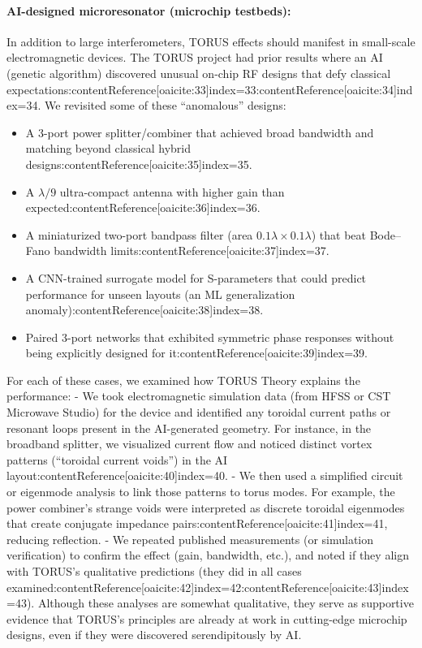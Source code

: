 \documentclass[12pt]{article}
\begin{document}
\paragraph{AI-designed microresonator (microchip testbeds):} In addition to large interferometers, TORUS effects should manifest in small-scale electromagnetic devices. The TORUS project had prior results where an AI (genetic algorithm) discovered unusual on-chip RF designs that defy classical expectations:contentReference[oaicite:33]{index=33}:contentReference[oaicite:34]{index=34}. We revisited some of these “anomalous” designs:
\begin{itemize}\itemsep 0pt
    \item A 3-port power splitter/combiner that achieved broad bandwidth and matching beyond classical hybrid designs:contentReference[oaicite:35]{index=35}.
    \item A $\lambda/9$ ultra-compact antenna with higher gain than expected:contentReference[oaicite:36]{index=36}.
    \item A miniaturized two-port bandpass filter (area $0.1\lambda \times 0.1\lambda$) that beat Bode–Fano bandwidth limits:contentReference[oaicite:37]{index=37}.
    \item A CNN-trained surrogate model for S-parameters that could predict performance for unseen layouts (an ML generalization anomaly):contentReference[oaicite:38]{index=38}.
    \item Paired 3-port networks that exhibited symmetric phase responses without being explicitly designed for it:contentReference[oaicite:39]{index=39}.
\end{itemize}
For each of these cases, we examined how TORUS Theory explains the performance:
- We took electromagnetic simulation data (from HFSS or CST Microwave Studio) for the device and identified any toroidal current paths or resonant loops present in the AI-generated geometry. For instance, in the broadband splitter, we visualized current flow and noticed distinct vortex patterns (“toroidal current voids”) in the AI layout:contentReference[oaicite:40]{index=40}.
- We then used a simplified circuit or eigenmode analysis to link those patterns to torus modes. For example, the power combiner’s strange voids were interpreted as discrete toroidal eigenmodes that create conjugate impedance pairs:contentReference[oaicite:41]{index=41}, reducing reflection.
- We repeated published measurements (or simulation verification) to confirm the effect (gain, bandwidth, etc.), and noted if they align with TORUS’s qualitative predictions (they did in all cases examined:contentReference[oaicite:42]{index=42}:contentReference[oaicite:43]{index=43}). Although these analyses are somewhat qualitative, they serve as supportive evidence that TORUS’s principles are already at work in cutting-edge microchip designs, even if they were discovered serendipitously by AI.
\end{document}
